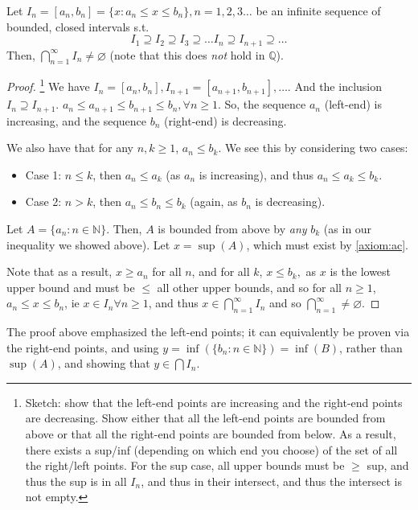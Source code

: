 \documentclass[12pt]{article}
\begin{document}
\begin{theorem}\label{thm:nestedinterval}
  Let $I_n = [a_n, b_n] = \{x : a_n \leq x \leq b_n\}, n  = 1,2,3 \dots$ be an infinite sequence of bounded, closed intervals s.t. \[I_1 \supseteq I_2 \supseteq I_3 \supseteq \dots I_n \supseteq I_{n+1} \supseteq \dots \]
  Then, $\bigcap_{n=1}^\infty I_n \neq \varnothing$ (note that this does \emph{not} hold in $\mathbb{Q}$).
\end{theorem}
\begin{proof}\footnote{Sketch: show that the left-end points are increasing and the right-end points are decreasing. Show either that all the left-end points are bounded from above or that all the right-end points are bounded from below. As a result, there exists a sup/inf (depending on which end you choose) of the set of all the right/left points. For the sup case, all upper bounds must be $\geq$ sup, and thus the sup is in all $I_n$, and thus in their intersect, and thus the intersect is not empty.}
  We have $I_n = [a_n, b_n], I_{n+1} = [a_{n+1}, b_{n+1}], \dots$. And the inclusion $I_n \supseteq I_{n+1}$. $a_n \leq a_{n+1} \leq b_{n+1} \leq b_{n}, \forall n \geq 1$. So, the sequence $a_n$ (left-end) is increasing, and the sequence $b_n$ (right-end) is decreasing. 
  
  We also have that for any $n, k \geq 1$, $a_n \leq b_k$. We see this by considering two cases:
  \begin{itemize}
    \item Case 1: $n \leq k$, then $a_n \leq a_k$ (as $a_n$ is increasing), and thus $a_n \leq a_k \leq b_k$.
    \item Case 2: $n > k$, then $a_n \leq b_n \leq b_k$ (again, as $b_n$ is decreasing). 
  \end{itemize}
  Let $A = \{a_n : n \in \mathbb{N}\}$. Then, $A$ is bounded from above by \emph{any} $b_k$ (as in our inequality we showed above). Let $x = \sup(A)$, which must exist by \cref{axiom:ac}.

  Note that as a result, \(x \geq a_n\) for all $n$, and for all $k$, \(x \leq b_k,\) as $x$ is the lowest upper bound and must be $\leq$ all other upper bounds, and so for all $n \geq 1$, $a_n \leq x \leq b_n$, ie $x \in I_n \forall n \geq 1$, and thus $x \in \bigcap_{n=1}^{\infty} I_n$ and so $\bigcap_{n=1}^{\infty} \neq \varnothing$.
\end{proof}

\begin{remark}
  The proof above emphasized the left-end points; it can equivalently be proven via the right-end points, and using $y=\inf(\{b_n : n \in \mathbb{N}\}) = \inf(B)$, rather than $\sup(A)$, and showing that $y \in \bigcap I_n$.
\end{remark}
\end{document}

